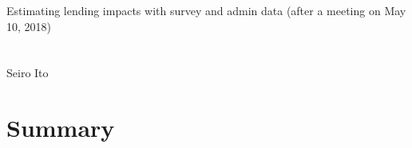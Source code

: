 \hfil Estimating lending impacts with survey and admin data (after a meeting on May 10, 2018)\\

\hfil\MonthDY\\
\hfil{\footnotesize\currenttime}\\

\hfil Seiro Ito

\setcounter{tocdepth}{3}
\tableofcontents
\newpage

\setlength{\parindent}{1em}
\vspace{2ex}



\section{Summary}

